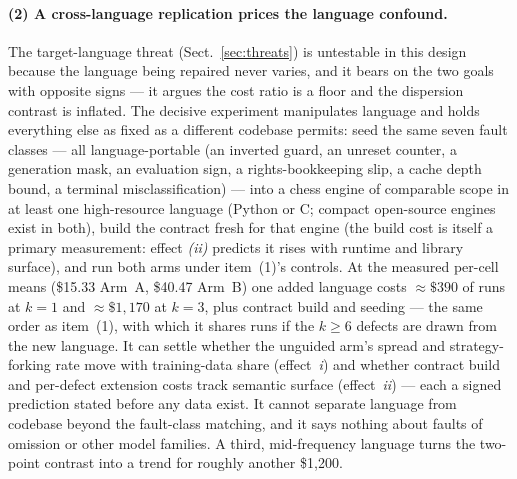 \documentclass[runningheads]{llncs}
\begin{document}
\paragraph{(2) A cross-language replication prices the language confound.}
The target-language threat (Sect.~\ref{sec:threats}) is untestable in this
design because the language being repaired never varies, and it bears on
the two goals with opposite signs --- it argues the cost ratio is a floor
and the dispersion contrast is inflated. The decisive experiment
manipulates language and holds everything else as fixed as a different
codebase permits: seed the same seven fault classes --- all
language-portable (an inverted guard, an unreset counter, a generation
mask, an evaluation sign, a rights-bookkeeping slip, a cache depth bound, a
terminal misclassification) --- into a chess engine of comparable scope in
at least one high-resource language (Python or C; compact open-source
engines exist in both), build the contract fresh for that engine (the
build cost is itself a primary measurement: effect \emph{(ii)} predicts it
rises with runtime and library surface), and run both arms under
item~(1)'s controls. At the measured per-cell means (\$15.33 Arm~A,
\$40.47 Arm~B) one added language costs ${\approx}\$390$ of runs at $k=1$
and ${\approx}\$1{,}170$ at $k=3$, plus contract build and seeding --- the
same order as item~(1), with which it shares runs if the $k\geq 6$ defects
are drawn from the new language. It can settle whether the unguided arm's
spread and strategy-forking rate move with training-data share
(effect~\emph{i}) and whether contract build and per-defect extension
costs track semantic surface (effect~\emph{ii}) --- each a signed
prediction stated before any data exist. It cannot separate language from
codebase beyond the fault-class matching, and it says nothing about faults
of omission or other model families. A third, mid-frequency language turns
the two-point contrast into a trend for roughly another \$1{,}200.
\end{document}
